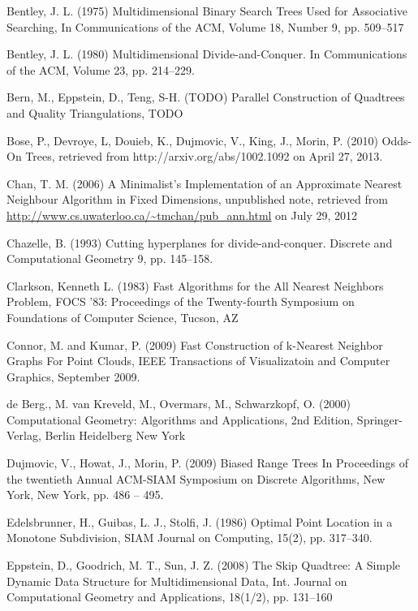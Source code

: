 \documentclass[mcs]{scsthesis}
\begin{document}
\begin{thebibliography}{5}
Bentley, J. L. (1975) Multidimensional Binary Search Trees Used for Associative
Searching, In Communications of the ACM, Volume 18, Number 9, pp. 509--517 

Bentley, J. L. (1980) Multidimensional Divide-and-Conquer.
In Communications of the ACM, Volume 23, pp. 214--229.

Bern, M., Eppstein, D., Teng, S-H. (TODO) Parallel Construction of Quadtrees and
Quality Triangulations, TODO

Bose, P., Devroye, L, Douieb, K., Dujmovic, V., King, J., Morin, P. (2010)
Odds-On Trees, retrieved from http://arxiv.org/abs/1002.1092 on April 27, 2013.

Chan, T. M. (2006) A Minimalist's Implementation of an Approximate Nearest
Neighbour Algorithm in Fixed Dimensions, unpublished note, retrieved from
\url{http://www.cs.uwaterloo.ca/~tmchan/pub\_ann.html} on July 29, 2012

 Chazelle, B. (1993) Cutting hyperplanes for divide-and-conquer.
Discrete and Computational Geometry 9, pp. 145--158.

Clarkson, Kenneth L. (1983) Fast Algorithms for the All Nearest Neighbors Problem,
FOCS '83: Proceedings of the Twenty-fourth Symposium on Foundations of Computer Science,
Tucson, AZ 

Connor, M. and Kumar, P. (2009) Fast Construction of k-Nearest Neighbor Graphs
For Point Clouds, IEEE Transactions of Visualizatoin and Computer Graphics,
September 2009.

de Berg., M. van Kreveld, M., Overmars, M., Schwarzkopf, O. (2000)
Computational Geometry: Algorithms and Applications, 2nd Edition, Springer-Verlag,
Berlin Heidelberg New York

Dujmovic, V., Howat, J., Morin, P. (2009) Biased Range Trees
In Proceedings of the twentieth Annual ACM-SIAM Symposium on Discrete Algorithms,
New York, New York, pp. 486 -- 495.

Edelsbrunner, H., Guibas, L. J., Stolfi, J. (1986) Optimal Point Location in a
Monotone Subdivision, SIAM Journal on Computing, 15(2), pp. 317--340. 

Eppstein, D., Goodrich, M. T., Sun, J. Z. (2008) The Skip Quadtree: A Simple
Dynamic Data Structure for Multidimensional Data, Int. Journal on Computational
Geometry and Applications, 18(1/2), pp. 131--160 


\end{thebibliography}
\end{document}
